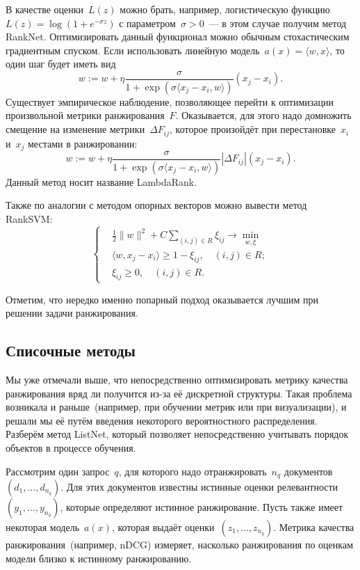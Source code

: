 \documentclass[12pt,fleqn]{article}
\begin{document}
В качестве оценки~$L(z)$ можно брать, например, логистическую функцию~$L(z) = \log(1 + e^{-\sigma z})$ с параметром~$\sigma > 0$~---
в этом случае получим метод RankNet.
Оптимизировать данный функционал можно обычным стохастическим градиентным спуском.
Если использовать линейную модель~$a(x) = \langle w, x \rangle$, то один шаг будет иметь вид
\[
    w
    :=
    w
    +
    \eta
    \frac{
        \sigma
    }{
        1 + \exp(
            \sigma
            \langle x_j - x_i, w \rangle
        )
    }
    (x_j - x_i).
\]
Существует эмпирическое наблюдение, позволяющее перейти к оптимизации произвольной метрики ранжирования~$F$.
Оказывается, для этого надо домножить смещение на изменение метрики~$\Delta F_{ij}$, которое произойдёт при перестановке~$x_i$ и~$x_j$
местами в ранжировании:
\[
    w
    :=
    w
    +
    \eta
    \frac{
        \sigma
    }{
        1 + \exp(
            \sigma
            \langle x_j - x_i, w \rangle
        )
    }
    |\Delta F_{ij}|
    (x_j - x_i).
\]
Данный метод носит название LambdaRank.


Также по аналогии с методом опорных векторов можно вывести метод RankSVM:
\[
    \left\{
    \begin{aligned}
        &\frac{1}{2} \|w\|^2 + C \sum_{(i, j) \in R} \xi_{ij} \to \min_{w, \xi}\\
        &\langle w, x_j - x_i \rangle \geq 1 - \xi_{ij}, \quad (i, j) \in R;\\
        &\xi_{ij} \geq 0, \quad (i, j) \in R.
    \end{aligned}
    \right.
\]

Отметим, что нередко именно попарный подход оказывается лучшим при решении задачи ранжирования.

\subsection{Списочные методы}

Мы уже отмечали выше, что непосредственно оптимизировать метрику качества ранжирования вряд ли
получится из-за её дискретной структуры.
Такая проблема возникала и раньше~(например, при обучении метрик или при визуализации),
и решали мы её путём введения некоторого вероятностного распределения.
Разберём метод ListNet, который позволяет непосредственно учитывать порядок
объектов в процессе обучения.

Рассмотрим один запрос~$q$, для которого надо отранжировать~$n_q$ документов~$(d_1, \dots, d_{n_q})$.
Для этих документов известны истинные оценки релевантности~$(y_1, \dots, y_{n_q})$,
которые определяют истинное ранжирование.
Пусть также имеет некоторая модель~$a(x)$, которая выдаёт оценки~$(z_1, \dots, z_{n_q})$.
Метрика качества ранжирования~(например, nDCG) измеряет, насколько ранжирования по оценкам модели
близко к истинному ранжированию.
\end{document}
